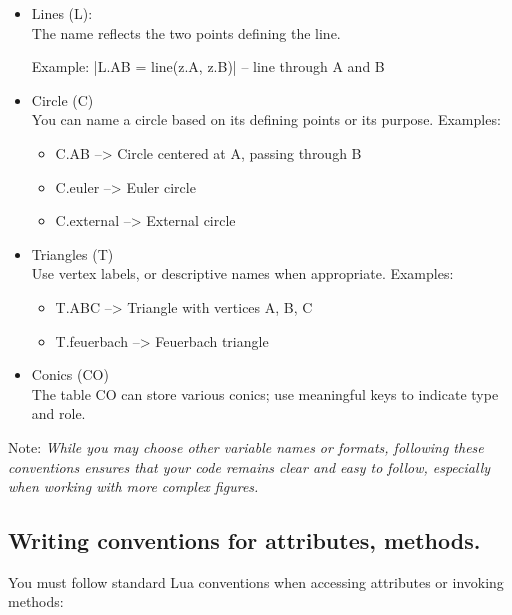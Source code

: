 \begin{itemize}
  \item Lines (L):\\
  The name reflects the two points defining the line.

   Example: |L.AB = line(z.A, z.B)| -- line through A and B

\item Circle (C)\\
You can name a circle based on its defining points or its purpose.
Examples:
\begin{itemize}
 \item C.AB       --> Circle centered at A, passing through B
 \item C.euler    --> Euler circle
 \item C.external --> External circle
\end{itemize}

\item Triangles (T)\\
Use vertex labels, or descriptive names when appropriate. Examples:

\begin{itemize}
  \item T.ABC         --> Triangle with vertices A, B, C
  \item T.feuerbach   --> Feuerbach triangle

\end{itemize}



\item Conics (CO)\\
The table CO can store various conics; use meaningful keys to indicate type and role.


\end{itemize}

Note: \emph{While you may choose other variable names or formats, following these conventions ensures that your code remains clear and easy to follow, especially when working with more complex figures.}


\subsection{Writing conventions for attributes, methods.} %
\label{sub:writing_conventions_for_attributes_methods_and_functions}

You must follow standard Lua conventions when accessing attributes or invoking methods:


